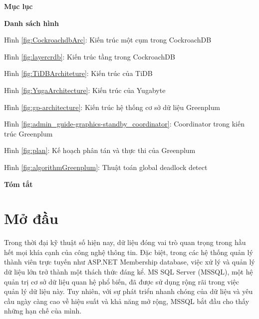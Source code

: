 \documentclass[14pt]{article}
\renewcommand{\contentsname}{Nội dung}
\renewcommand{\contentsname}{\vspace{-5cm}} %
\begin{document}
    \begin{center}
\textbf{Mục lục}
\end{center}

\renewcommand{\contentsname}{}
\tableofcontents 

\pagebreak

        \begin{center}
\textbf{Danh sách hình}
\end{center}  

Hình \ref{fig:CockroachdbArc}: Kiến trúc một cụm trong CockroachDB \dotfill \pageref{fig:CockroachdbArc}

Hình \ref{fig:layercrdb}: Kiến trúc tầng trong CockroachDB \dotfill \pageref{fig:layercrdb}

Hình \ref{fig:TiDBArchiteture}: Kiến trúc của  TiDB \dotfill \pageref{fig:TiDBArchiteture}

Hình \ref{fig:YugaArchitecture}: Kiến trúc của Yugabyte \dotfill \pageref{fig:YugaArchitecture}

Hình \ref{fig:gp-architecture}: Kiến trúc hệ thống cơ sở dữ liệu Greenplum \dotfill \pageref{fig:gp-architecture}

Hình \ref{fig:admin_guide-graphics-standby_coordinator}: Coordinator trong kiến trúc Greenplum \dotfill \pageref{fig:admin_guide-graphics-standby_coordinator}

Hình \ref{fig:plan}: Kế hoạch phân tán và thực thi của Greenplum  \dotfill \pageref{fig:plan}

Hình \ref{fig:algorithmGreenplum}: Thuật toán global deadlock detect \dotfill \pageref{fig:algorithmGreenplum}


    

 \begin{center}
\textbf{Tóm tắt}

\pagebreak

\end{center}

    {
    
    }

    
    


    


    
\section{Mở đầu}
Trong thời đại kỹ thuật số hiện nay, dữ liệu đóng vai trò quan trọng trong hầu hết mọi khía cạnh của công nghệ thông tin. Đặc biệt, trong các hệ thống quản lý thành viên trực tuyến như ASP.NET Membership database, việc xử lý và quản lý dữ liệu lớn trở thành một thách thức đáng kể. MS SQL Server (MSSQL), một hệ quản trị cơ sở dữ liệu quan hệ phổ biến, đã được sử dụng rộng rãi trong việc quản lý dữ liệu này. Tuy nhiên, với sự phát triển nhanh chóng của dữ liệu và yêu cầu ngày càng cao về hiệu suất và khả năng mở rộng, MSSQL bắt đầu cho thấy những hạn chế của mình.
\end{document}
